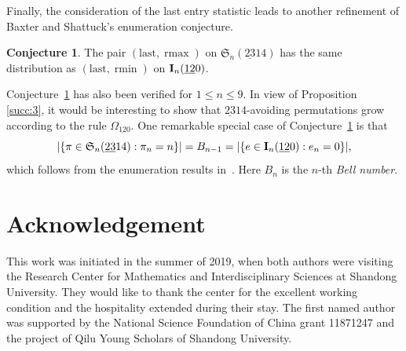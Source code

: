 \documentclass[12pt,A4]{amsart}
\numberwithin{equation}{section}
\theoremstyle{plain}
\theoremstyle{definition}
\newtheorem{conjecture}[theorem]{Conjecture}
\def\S{\mathfrak{S}}
\def\last{\mathrm{last}}
\def\I{\operatorname{{\bf I}}}
\def\rmin{\operatorname{rmin}}
\def\rmax{\operatorname{rmax}}
\begin{document}
Finally,  the consideration of the last entry statistic  leads to another refinement of Baxter and Shattuck's enumeration conjecture. 
\begin{conjecture}\label{conj:fu-lin2}
The pair $(\last,\rmax)$ on $\S_n(\underline{23}14)$ has the same distribution as $(\last,\rmin)$ on $\I_n(\underline{12}0)$. 
\end{conjecture}
Conjecture~\ref{conj:fu-lin2} has also been verified for $1\leq n\leq9$. In view of Proposition~
\ref{succ:3}, it would be interesting to show that $\underline{23}14$-avoiding permutations grow according to the rule $\Omega_{\mathrm{\underline{12}0}}$. One remarkable special case of Conjecture~\ref{conj:fu-lin2}  is that 
$$
|\{\pi\in\S_n(\underline{23}14): \pi_n=n\}|=B_{n-1}=|\{e\in\I_n(\underline{12}0): e_n=0\}|, 
$$
which follows from the enumeration results in~\cite{cla,ly}. 
Here $B_{n}$ is the $n$-th {\em Bell number}.


\section*{Acknowledgement}
This work was initiated in the summer of 2019, when both authors were visiting the Research Center for Mathematics and Interdisciplinary Sciences at Shandong University. They would like to thank the center for the excellent working condition and the hospitality extended during their stay. The first named author was supported by the National Science Foundation of China grant 11871247 and the project of Qilu Young Scholars of Shandong University. 
\end{document}
